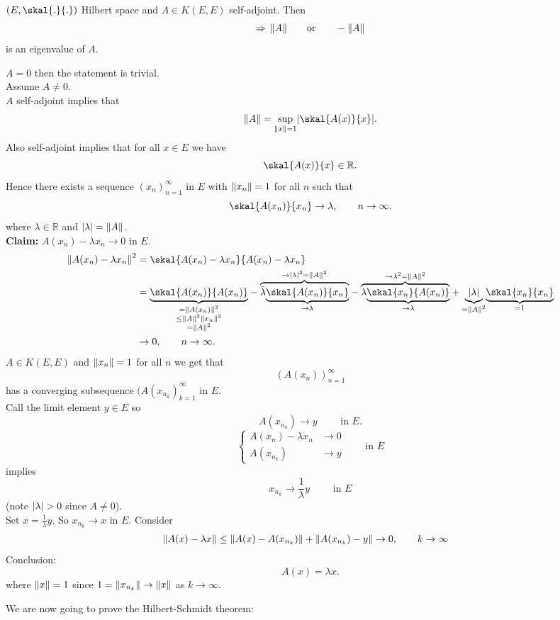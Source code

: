\begin{proposition}
	$(E, \skal{.}{.})$ Hilbert space and $A \in K(E,E)$ self-adjoint. Then
	\[
		\Rightarrow \,\norm{A} \qquad \text{or} \qquad  - \norm{A}
	\]
	is an eigenvalue of $A$.
\end{proposition}
\begin{beweis}
	$A = 0$ then the statement is trivial. \\
	Assume $A \neq 0$. \\
	$A$ self-adjoint implies that 
	\[
		\norm{A} = \sup_{\norm{x}=1} \abs{\skal{A(x)}{x}}.
	\]
	Also self-adjoint implies that for all $x \in E$ we have
	\[
		\skal{A(x)}{x} \in \mathbb{R}.
	\]
	Hence there exists a sequence $(x_n)_{n=1}^{\infty}$ in $E$ with $\norm{x_n}=1$ for all $n$ such that
	\[
		\skal{A(x_n)}{x_n} \to \lambda, \qquad n \to \infty.
	\]
	where $\lambda \in \mathbb{R}$ and $\abs{\lambda} = \norm{A}$. \\
	\textbf{Claim:} \text{    }$A(x_n) - \lambda x_n \to 0$ in $E$. \\
	\begin{align*}
		\norm{A(x_n)- \lambda x_n}^2 &= \skal{A(x_n)-\lambda x_n}{A(x_n)- \lambda x_n} \\
		&= \underset{\substack{= \norm{A(x_n)}^2 \\ \leq \norm{A}^2 \norm{x_n}^2 \\ = \norm{A}^2}}{\underbrace{\skal{A(x_n)}{A(x_n)}}}- 
		\overset{\to \abs{\lambda}^2 = \norm{A}^2}{\overbrace{\bar{\lambda} 
		\underset{ \to  \lambda}{\underbrace{\skal{A(x_n)}{x_n}}}}}- \overset{\to \lambda^2 = \norm{A}^2}{\overbrace{\lambda \underset{\to \lambda}{\underbrace{\skal{x_n}{A(x_n)}}}}} + \underset{= \norm{A}^2}{\underbrace{\abs{\lambda}}} \underset{=1}{\underbrace{\skal{x_n}{x_n}}} \\
		&\to 0, \qquad n \to \infty.
	\end{align*}
	$A \in K(E,E)$ and $\norm{x_n}=1$ for all $n$ we get that 
	\[
		(A(x_n))_{n=1}^{\infty} 
	\]
	has a converging subsequence $(A(x_{n_k})_{k=1}^{\infty}$ in $E$. \\
	Call the limit element $y \in E$ so
	\[
		A(x _{n_k}) \to y \qquad \text{ in }E. 
	\]
	\[
		\begin{cases}
			A(x_n) - \lambda x_n &\to 0\\
			A(x _{n_k}) &\to y
		\end{cases} \qquad \text{in }E
	\]
	implies
	\[
		x _{n_k} \to  \frac{1}{\lambda}y \qquad \text{ in }E
	\]
	(note $\lvert\lambda\rvert>0$ since $A \neq 0$). \\
	Set $x = \frac{1}{\lambda}y$. So $x _{n_k} \to x$ in $E$. Consider
	\begin{align*}
		\norm{A(x)- \lambda x} &\leq  \norm{A(x)-A(x _{n_k})} + \norm{A(x _{n_k})- y} \to 0, \qquad k \to \infty
	\end{align*}
	Conclusion: \[
		A(x) = \lambda x.
	\]
	where $\norm{x}=1$ since $1 = \norm{x _{n_k}} \to  \norm{x}$ as $k \to \infty$.
\end{beweis}
We are now going to prove the Hilbert-Schmidt theorem:

